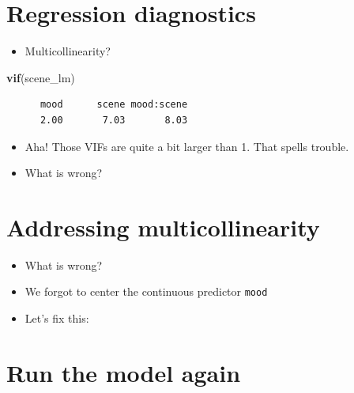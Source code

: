 \documentclass[]{article}
\newenvironment{Shaded}{}{}
\newcommand{\KeywordTok}[1]{\textcolor[rgb]{0.00,0.44,0.13}{\textbf{{#1}}}}
\newcommand{\DataTypeTok}[1]{\textcolor[rgb]{0.56,0.13,0.00}{{#1}}}
\newcommand{\StringTok}[1]{\textcolor[rgb]{0.25,0.44,0.63}{{#1}}}
\newcommand{\CommentTok}[1]{\textcolor[rgb]{0.38,0.63,0.69}{\textit{{#1}}}}
\newcommand{\OtherTok}[1]{\textcolor[rgb]{0.00,0.44,0.13}{{#1}}}
\newcommand{\NormalTok}[1]{{#1}}
\begin{document}
\section{Regression diagnostics}\label{regression-diagnostics}

\begin{itemize}
\itemsep1pt\parskip0pt
\item
  Multicollinearity?
\end{itemize}

\begin{Shaded}
\begin{Highlighting}[]
\KeywordTok{vif}\NormalTok{(scene_lm)}
\end{Highlighting}
\end{Shaded}

\begin{verbatim}
      mood      scene mood:scene 
      2.00       7.03       8.03 
\end{verbatim}

\begin{itemize}
\itemsep1pt\parskip0pt
\item
  Aha! Those VIFs are quite a bit larger than 1. That spells trouble.
\item
  What is wrong?
\end{itemize}

\section{Addressing
multicollinearity}\label{addressing-multicollinearity}

\begin{itemize}
\itemsep1pt\parskip0pt
\item
  What is wrong?
\item
  We forgot to center the continuous predictor \texttt{mood}
\item
  Let's fix this:
\end{itemize}

\begin{Shaded}
\end{Shaded}

\section{Run the model again}\label{run-the-model-again}
\end{document}
